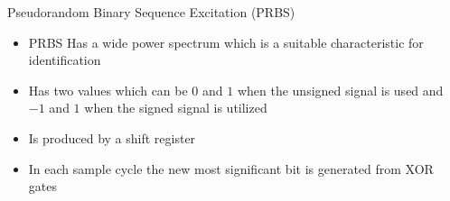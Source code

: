 \documentclass[11pt,aspectratio=169]{beamer}
\begin{document}
\begin{frame}{Pseudorandom Binary Sequence  Excitation (PRBS)}
\begin{itemize}
    \item PRBS Has a wide power spectrum which is a suitable characteristic for identification
    \item Has two values which can be $0$ and $1$ when the unsigned signal is used and $-1$ and $1$ when the signed signal is utilized
    \item Is produced by a shift register 
    \item  In each sample cycle the new most significant bit is generated from XOR gates
\end{itemize}
\footnotesize 
   \begin{center}
    
    \end{center}
\end{frame}
\begin{frame}
\footnotesize 
\begin{center}

\end{center}
\end{frame}
    \begin{itemize}
    \end{itemize}
\end{document}
